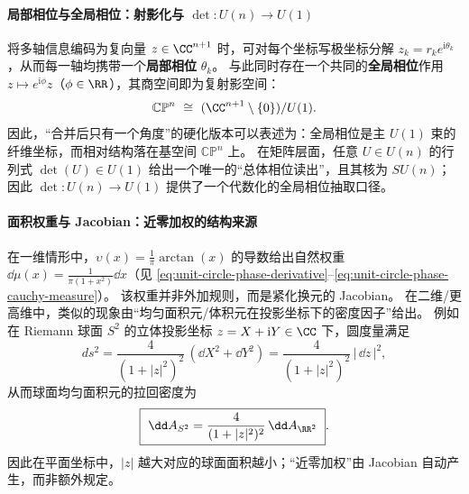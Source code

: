 \paragraph{局部相位与全局相位：射影化与 \texorpdfstring{$\det:U(n)\to U(1)$}{det}}
将多轴信息编码为复向量 \(z\in\CC^{n+1}\) 时，可对每个坐标写极坐标分解 \(z_k=r_k e^{\mathrm{i}\theta_k}\)，从而每一轴均携带一个\textbf{局部相位} \(\theta_k\)。
与此同时存在一个共同的\textbf{全局相位}作用 \(z\mapsto e^{\mathrm{i}\phi}z\)（\(\phi\in\RR\)），其商空间即为复射影空间：
\[
\mathbb{CP}^{n}\ \cong\ (\CC^{n+1}\setminus\{0\})/U(1).
\]
因此，“合并后只有一个角度”的硬化版本可以表述为：全局相位是主 \(U(1)\) 束的纤维坐标，而相对结构落在基空间 \(\mathbb{CP}^{n}\) 上。
在矩阵层面，任意 \(U\in U(n)\) 的行列式 \(\det(U)\in U(1)\) 给出一个唯一的“总体相位读出”，且其核为 \(SU(n)\)；因此 \(\det:U(n)\to U(1)\) 提供了一个代数化的全局相位抽取口径。

\paragraph{面积权重与 Jacobian：近零加权的结构来源}
在一维情形中，\(\upsilon(x)=\frac{1}{\pi}\arctan(x)\) 的导数给出自然权重 \(\dd\mu(x)=\frac{1}{\pi(1+x^2)}\dd x\)（见 \eqref{eq:unit-circle-phase-derivative}--\eqref{eq:unit-circle-phase-cauchy-measure}）。
该权重并非外加规则，而是紧化换元的 Jacobian。
在二维/更高维中，类似的现象由“均匀面积元/体积元在投影坐标下的密度因子”给出。
例如在 Riemann 球面 \(S^{2}\) 的立体投影坐标 \(z=X+\mathrm{i}Y\in\CC\) 下，圆度量满足
\[
ds^{2}=\frac{4}{(1+|z|^{2})^{2}}\,(\dd X^{2}+\dd Y^{2})
=\frac{4}{(1+|z|^{2})^{2}}\,|\,\dd z\,|^{2},
\]
从而球面均匀面积元的拉回密度为
\[
\boxed{\ \dd A_{S^{2}}=\frac{4}{(1+|z|^{2})^{2}}\,\dd A_{\RR^{2}}\ }.
\]
因此在平面坐标中，\(|z|\) 越大对应的球面面积越小；“近零加权”由 Jacobian 自动产生，而非额外规定。

